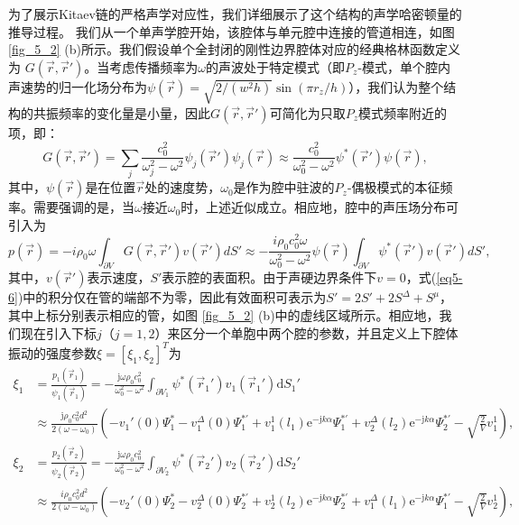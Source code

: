 为了展示Kitaev链的严格声学对应性，我们详细展示了这个结构的声学哈密顿量的推导过程。
我们从一个单声学腔开始，该腔体与单元腔中连接的管道相连，如图 \ref{fig_5_2} (b)所示。我们假设单个全封闭的刚性边界腔体对应的经典格林函数定义为 \( G(\vec{r}, \vec{r}') \)。当考虑传播频率为$\omega$的声波处于特定模式（即$P_z$-模式，单个腔内声速势的归一化场分布为$\psi(\vec{r}) = \sqrt{2/(w^2h)}\sin(\pi r_z/h)$），我们认为整个结构的共振频率的变化量是小量，因此$G(\vec{r},\vec{r}')$可简化为只取$P_z$模式频率附近的项，即：
\begin{equation}\label{eq5-5}
    G(\vec{r},\vec{r}') = \sum_{j} \frac{c_0^2}{\omega_j^2 - \omega^2} \psi_j(\vec{r}')\psi_j(\vec{r}) \approx \frac{c_0^2}{\omega_0^2 - \omega^2} \psi^*(\vec{r}')\psi(\vec{r}),
\end{equation}
其中，$\psi(\vec{r})$是在位置$\vec{r}$处的速度势，$\omega_0$是作为腔中驻波的$P_z$-偶极模式的本征频率。需要强调的是，当$\omega$接近$\omega_0$时，上述近似成立。相应地，腔中的声压场分布可引入为
\begin{equation}\label{eq5-6}
    p(\vec{r}) = -i\rho_0\omega \int_{\partial V} G(\vec{r},\vec{r}')v(\vec{r}')dS' \approx -\frac{i\rho_0c_0^2\omega}{\omega_0^2 - \omega^2} \psi(\vec{r}) \int_{\partial V} \psi^*(\vec{r}')v(\vec{r}')dS',
\end{equation}
其中，$v(\vec{r}')$表示速度，$S'$表示腔的表面积。由于声硬边界条件下$v = 0$，式(\ref{eq5-6})中的积分仅在管的端部不为零，因此有效面积可表示为$S' = 2S' + 2S^{\Delta} + S^{\mu}$，其中上标分别表示相应的管，如图 \ref{fig_5_2} (b)中的虚线区域所示。相应地，我们现在引入下标$j$（$j = 1,2$）来区分一个单胞中两个腔的参数，并且定义上下腔体振动的强度参数$\xi = [\xi_1,\xi_2]^T$为
\begin{equation}\label{eq5-7}
    \begin{split}
    \xi_1 & = \frac{p_1(\vec{r}_1)}{\psi_1(\vec{r}_1)} = -\frac{\mathrm{j}\omega\rho_0c_0^2}{\omega_0^2 - \omega^2} \int_{\partial V_1} \psi^*(\vec{r}_1')v_1(\vec{r}_1')\mathrm{d}S_1' \\
    & \approx \frac{\mathrm{j}\rho_0c_0^2d^2}{2(\omega - \omega_0)} (-v_1'(0) \Psi_1^* - v_1^{\Delta}(0) \Psi_1^{*'} + v_1^1(l_1) \mathrm{e}^{-\mathrm{j}k\alpha} \Psi_1^{*'} + v_2^{\Delta}(l_2) \mathrm{e}^{-\mathrm{j}k\alpha} \Psi_2^{*'} - \sqrt{\frac{2}{V}}v_1^1), \\
    \xi_2 & = \frac{p_2(\vec{r}_2)}{\psi_2(\vec{r}_2)} = -\frac{\mathrm{j}\omega\rho_0c_0^2}{\omega_0^2 - \omega^2} \int_{\partial V_2} \psi^*(\vec{r}_2')v_2(\vec{r}_2')\mathrm{d}S_2' \\
    & \approx \frac{i\rho_0c_0^2d^2}{2(\omega - \omega_0)} (-v_2'(0) \Psi_2^* - v_2^{\Delta}(0) \Psi_2^{*'} + v_2^1(l_2) \mathrm{e}^{-\mathrm{j}k\alpha} \Psi_2^{*'} + v_1^{\Delta}(l_1) \mathrm{e}^{-\mathrm{j}k\alpha} \Psi_1^{*'} - \sqrt{\frac{2}{V}}v_2^1),
    \end{split}
\end{equation}
